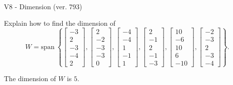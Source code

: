 \begin{exercise}
  \begin{exerciseTitle}V8 - Dimension (ver. 793)\end{exerciseTitle}
  \begin{exerciseStatement}
    Explain how to find the dimension of 
\[W=\mathrm{span}\ \left\{\left[\begin{array}{r}
-3 \\
2 \\
-3 \\
-4 \\
2
\end{array}\right] , \left[\begin{array}{r}
2 \\
-2 \\
-3 \\
-3 \\
0
\end{array}\right] , \left[\begin{array}{r}
-4 \\
-4 \\
1 \\
-1 \\
1
\end{array}\right] , \left[\begin{array}{r}
2 \\
-1 \\
2 \\
-1 \\
-3
\end{array}\right] , \left[\begin{array}{r}
10 \\
-6 \\
10 \\
6 \\
-10
\end{array}\right] , \left[\begin{array}{r}
-2 \\
-3 \\
2 \\
-3 \\
-4
\end{array}\right]\right\}.\]



  \end{exerciseStatement}
  \begin{exerciseAnswer}
   The dimension of \(W\) is  \(5\).
  


  \end{exerciseAnswer}
\end{exercise}